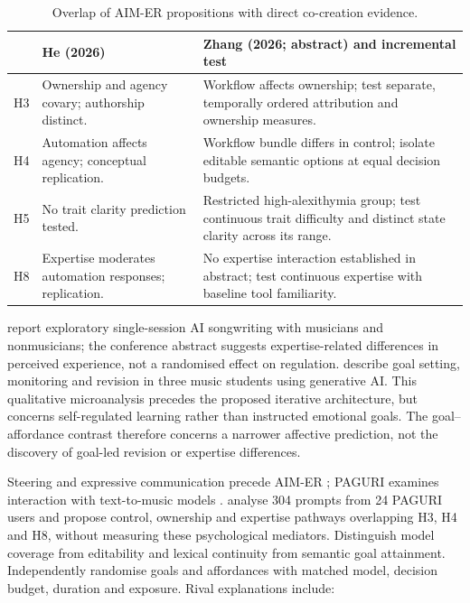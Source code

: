 \begin{table}[htbp]
\centering\small
\caption{Overlap of AIM-ER propositions with direct co-creation evidence.}
\begin{tabularx}{\linewidth}{@{}>{\raggedright\arraybackslash}p{.1\linewidth}>{\raggedright\arraybackslash}X>{\raggedright\arraybackslash}X@{}}
\toprule
 & He (2026) & Zhang (2026; abstract) and incremental test \\
\midrule
H3 & Ownership and agency covary; authorship distinct. & Workflow affects ownership; test separate, temporally ordered attribution and ownership measures. \\
H4 & Automation affects agency; conceptual replication. & Workflow bundle differs in control; isolate editable semantic options at equal decision budgets. \\
H5 & No trait clarity prediction tested. & Restricted high-alexithymia group; test continuous trait difficulty and distinct state clarity across its range. \\
H8 & Expertise moderates automation responses; replication. & No expertise interaction established in abstract; test continuous expertise with baseline tool familiarity. \\
\bottomrule
\end{tabularx}
\end{table}

\citet{swarbrick2026} report exploratory single-session AI songwriting with musicians and nonmusicians; the conference abstract suggests expertise-related differences in perceived experience, not a randomised effect on regulation. \citet{zhangliu2026} describe goal setting, monitoring and revision in three music students using generative AI. This qualitative microanalysis precedes the proposed iterative architecture, but concerns self-regulated learning rather than instructed emotional goals. The goal--affordance contrast therefore concerns a narrower affective prediction, not the discovery of goal-led revision or expertise differences.

Steering and expressive communication precede AIM-ER \citep{louie2020,louie2022}; PAGURI examines interaction with text-to-music models \citep{ronchini2025}. \citet{zhangpan2026} analyse 304 prompts from 24 PAGURI users and propose control, ownership and expertise pathways overlapping H3, H4 and H8, without measuring these psychological mediators. Distinguish model coverage from editability and lexical continuity from semantic goal attainment. Independently randomise goals and affordances with matched model, decision budget, duration and exposure. Rival explanations include:


